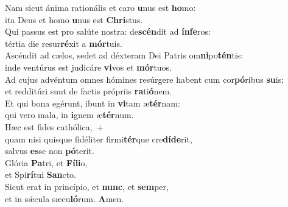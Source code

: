 \oddverse Nam sicut ánima rationális et caro \textbf{u}nus est \textbf{ho}mo:~\*\\
\oddverse ita Deus et homo \textbf{u}nus est \textbf{Chri}stus.\\
\evenverse Qui passus est pro salúte nostra: de\textbf{scén}dit ad \textbf{ín}\textbf{fe}ros:~\*\\
\evenverse tértia die resur\textbf{ré}xit a \textbf{mór}tuis.\\
\oddverse Ascéndit ad cælos, sedet ad déxteram Dei Patris om\textbf{ni}po\textbf{tén}tis:~\*\\
\oddverse inde ventúrus est judicáre \textbf{vi}vos et \textbf{mór}tuos.\\
\evenverse Ad cujus advéntum omnes hómines resúrgere habent cum cor\textbf{pó}ribus \textbf{su}is;~\*\\
\evenverse et redditúri sunt de factis própriis \textbf{ra}ti\textbf{ó}nem.\\
\oddverse Et qui bona egérunt, ibunt in \textbf{vi}tam æ\textbf{tér}nam:~\*\\
\oddverse qui vero mala, in \textbf{i}gnem æ\textbf{tér}num.\\
\evenverse Hæc est fides cathólica,~+\\
\evenverse  quam nisi quisque fidéliter firmi\textbf{tér}que cre\textbf{dí}\textbf{de}rit,~\*\\
\evenverse salvus \textbf{es}se non \textbf{pó}terit.\\
\oddverse Glória \textbf{Pa}tri, et \textbf{Fí}\textbf{li}o,~\*\\
\oddverse et Spi\textbf{rí}tui \textbf{San}cto.\\
\evenverse Sicut erat in princípio, et \textbf{nunc}, et \textbf{sem}per,~\*\\
\evenverse et in sǽcula sæcu\textbf{ló}rum. \textbf{A}men.\\
